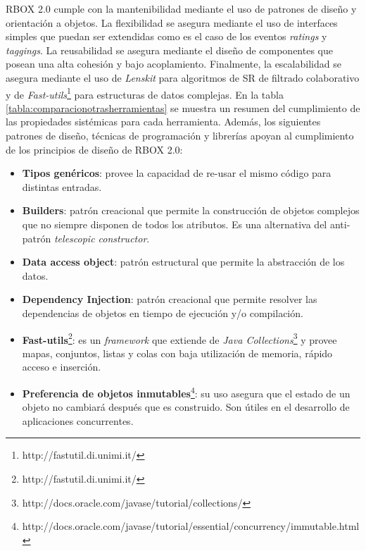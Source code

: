  RBOX 2.0 cumple con la mantenibilidad mediante el uso de patrones de diseño y orientación a objetos. La flexibilidad se asegura mediante el uso de interfaces simples que puedan ser extendidas como es el caso de los eventos \textit{ratings} y \textit{taggings}.  La reusabilidad se asegura mediante el diseño de componentes que posean una alta cohesión y bajo acoplamiento. Finalmente, la escalabilidad se asegura mediante el uso de \textit{Lenskit} para algoritmos de SR de filtrado colaborativo y de \textit{Fast-utils}\footnote{http://fastutil.di.unimi.it/} para estructuras de datos complejas. En la tabla \ref{tabla:comparacionotrasherramientas} se muestra un resumen del cumplimiento de las propiedades sistémicas para cada herramienta. Además, los siguientes patrones de diseño, técnicas de programación y librerías apoyan al cumplimiento de los principios de diseño de RBOX 2.0:
 
 \begin{itemize}
 	\item \textbf{Tipos genéricos}: provee la capacidad de re-usar el mismo código para distintas entradas.
 	\item \textbf{Builders}: patrón creacional que permite la construcción de objetos complejos que no siempre disponen de todos los atributos. Es una alternativa del anti-patrón \textit{telescopic constructor}.
 	\item \textbf{Data access object}: patrón estructural que permite la abstracción de los datos.
 	\item \textbf{Dependency Injection}: patrón creacional que permite resolver las dependencias de objetos en tiempo de ejecución y/o compilación.
 	\item \textbf{Fast-utils}\footnote{http://fastutil.di.unimi.it/}:  es un \textit{framework} que extiende de \textit{Java Collections}\footnote{http://docs.oracle.com/javase/tutorial/collections/} y provee mapas, conjuntos, listas y colas con baja utilización de memoria, rápido acceso e inserción.
 	\item \textbf{Preferencia de objetos inmutables}\footnote{http://docs.oracle.com/javase/tutorial/essential/concurrency/immutable.html}: su uso asegura que el estado de un objeto no cambiará después que es construido. Son útiles en el desarrollo de aplicaciones concurrentes.
 \end{itemize}
 
